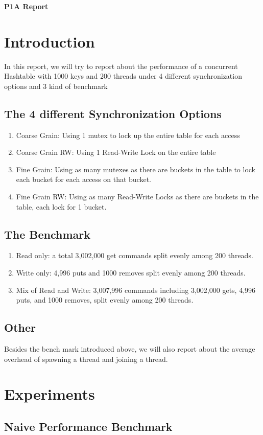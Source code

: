 \documentclass[11pt]{article}
\begin{document}
\centerline{\Large\textbf{P1A Report}}
\vspace{0.3cm}
\section{Introduction}
In this report, we will try to report about the performance of a concurrent Hashtable with 1000 keys and 200 threads under 4 different synchronization options and 3 kind of benchmark
\subsection{The 4 different Synchronization Options}
\begin{enumerate}
	\item Coarse Grain: Using 1 mutex to lock up the entire table for each access
	\item Coarse Grain RW: Using 1 Read-Write Lock on the entire table
	\item Fine Grain: Using as many mutexes as there are buckets in the table to lock each bucket for each access on that bucket.
	\item Fine Grain RW: Using as many Read-Write Locks as there are buckets in the table, each lock for 1 bucket.
\end{enumerate}
\subsection{The Benchmark}
\begin{enumerate}
	\item Read only: a total 3,002,000 get commands split evenly among 200 threads.
	\item Write only: 4,996 puts and 1000 removes split evenly among 200 threads.
	\item Mix of Read and Write: 3,007,996 commands including 3,002,000 gets, 4,996 puts, and 1000 removes, split evenly among 200 threads.
\end{enumerate}
\subsection{Other}
Besides the bench mark introduced above, we will also report about the average overhead of spawning a thread and joining a thread.
\section{Experiments}
\subsection{Naive Performance Benchmark}
\end{document}
